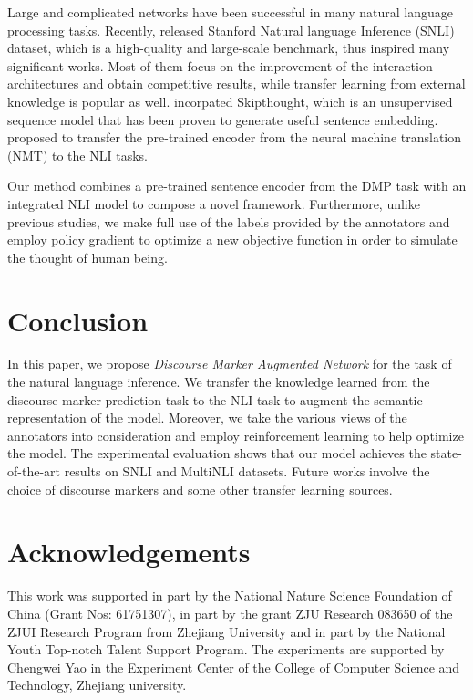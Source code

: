 \documentclass[11pt,letterpaper]{article}
\begin{document}
Large and complicated networks have been successful in many natural language processing tasks\cite{zhu2017next,Chen2017User,pan2017keyword}. Recently, \citet{bowman2015large} released Stanford Natural language Inference (SNLI) dataset, which is a high-quality and large-scale benchmark, thus inspired many significant works\cite{bowman2016fast,mou2016natural,vendrov2016order,conneau2017supervised,wang2017bilateral,gong2018natural,mccann2017learned,chen2017natural,choi2017learning,tay2017compare}. Most of them focus on the improvement of the interaction architectures and obtain competitive results, while transfer learning from external knowledge is popular as well. \citet{vendrov2016order} incorpated Skipthought\cite{kiros2015skip}, which is an unsupervised sequence model that has been proven to generate useful sentence embedding. \citet{mccann2017learned} proposed to transfer the pre-trained encoder from the neural machine translation (NMT) to the NLI tasks.

Our method combines a pre-trained sentence encoder from the DMP task with an integrated NLI model to compose a novel framework. Furthermore, unlike previous studies, we make full use of the labels provided by the annotators and employ policy gradient to optimize a new objective function in order to simulate the thought of human being.




\section{Conclusion}
In this paper, we propose \emph{Discourse Marker Augmented Network} for the task of the natural language inference. We transfer the knowledge learned from the discourse marker prediction task to the NLI task to augment the semantic representation of the model. Moreover, we take the various views of the annotators into consideration and employ reinforcement learning to help optimize the model. The experimental evaluation shows that our model achieves the state-of-the-art results on SNLI and MultiNLI datasets. Future works involve the choice of discourse markers and some other transfer learning sources.

\section{Acknowledgements}
This work was supported in part by the National Nature Science Foundation of China (Grant Nos: 61751307), in part by the grant ZJU Research 083650 of the ZJUI Research Program from Zhejiang University and in part by the National Youth Top-notch Talent Support Program. The experiments are supported by Chengwei Yao in the Experiment Center of the College of Computer Science and Technology, Zhejiang university.



\end{document}
